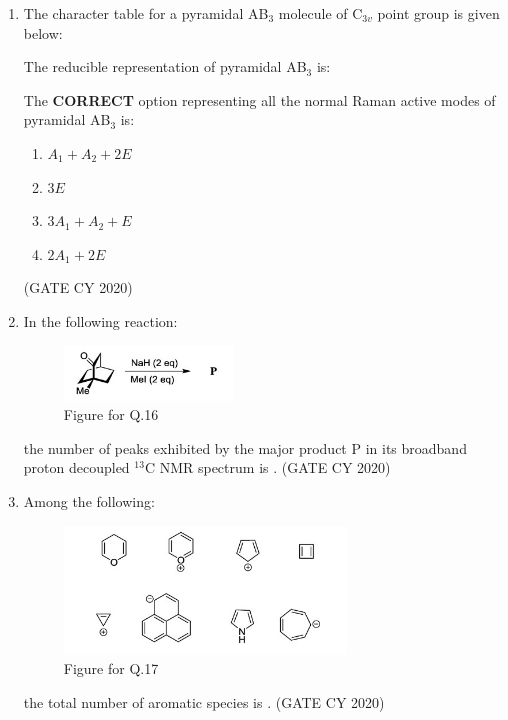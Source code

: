\documentclass[12pt]{article}
\begin{document}
\begin{enumerate}
\item The character table for a pyramidal AB$_3$ molecule of C$_{3v}$ point group is given below:

\begin{center}

 \captionsetup{type=table}
\end{center}

The reducible representation of pyramidal AB$_3$ is:

\begin{center}

 \captionsetup{type=table}
\end{center}

The \textbf{CORRECT} option representing all the normal Raman active modes of pyramidal AB$_3$ is:

\begin{multicols}{2}
\begin{enumerate}
    \item $A_1 + A_2 + 2E$
    \item $3E$
    \item $3A_1 + A_2 + E$
    \item $2A_1 + 2E$
\end{enumerate}
\end{multicols}
\hfill (GATE CY 2020)

\item In the following reaction:
\begin{figure}[H]
    \centering
    \includegraphics[width=0.4\columnwidth]{figs/q16.png}
    \caption{Figure for Q.16}
    \label{fig:q16}
\end{figure}
the number of peaks exhibited by the major product P in its broadband proton decoupled $^{13}$C NMR spectrum is \underline{\hspace{2cm}}.
\hfill (GATE CY 2020)

\item Among the following:
\begin{figure}[H]
    \centering
    \includegraphics[width=0.4\columnwidth]{figs/q17.png}
    \caption{Figure for Q.17}
    \label{fig:q17}
\end{figure}
the total number of aromatic species is \underline{\hspace{2cm}}.
\hfill (GATE CY 2020)


\end{enumerate}
\end{document}
